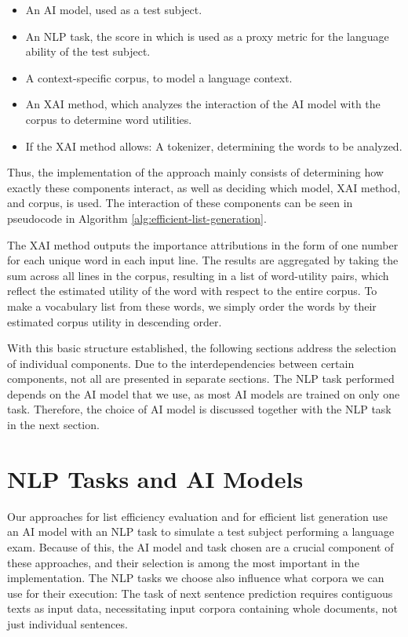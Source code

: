 \begin{itemize}
	\item An AI model, used as a test subject.
	\item An NLP task, the score in which is used as a proxy metric for the language ability of the test subject.
	\item A context-specific corpus, to model a language context.
	\item An XAI method, which analyzes the interaction of the AI model with the corpus to determine word utilities.
	\item If the XAI method allows: A tokenizer, determining the words to be analyzed.
\end{itemize}

Thus, the implementation of the approach mainly consists of determining how exactly these components interact, as well as deciding which model, XAI method, and corpus, is used.
The interaction of these components can be seen in pseudocode in Algorithm \ref{alg:efficient-list-generation}.



The XAI method outputs the importance attributions in the form of one number for each unique word in each input line.
The results are aggregated by taking the sum across all lines in the corpus, resulting in a list of word-utility pairs, which reflect the estimated utility of the word with respect to the entire corpus.
To make a vocabulary list from these words, we simply order the words by their estimated corpus utility in descending order.

With this basic structure established, the following sections address the selection of individual components.
Due to the interdependencies between certain components, not all are presented in separate sections.
The NLP task performed depends on the AI model that we use, as most AI models are trained on only one task.
Therefore, the choice of AI model is discussed together with the NLP task in the next section.

\section{NLP Tasks and AI Models}
Our approaches for list efficiency evaluation and for efficient list generation use an AI model with an NLP task to simulate a test subject performing a language exam.
Because of this, the AI model and task chosen are a crucial component of these approaches, and their selection is among the most important in the implementation.
The NLP tasks we choose also influence what corpora we can use for their execution:
The task of next sentence prediction requires contiguous texts as input data, necessitating input corpora containing whole documents, not just individual sentences.

